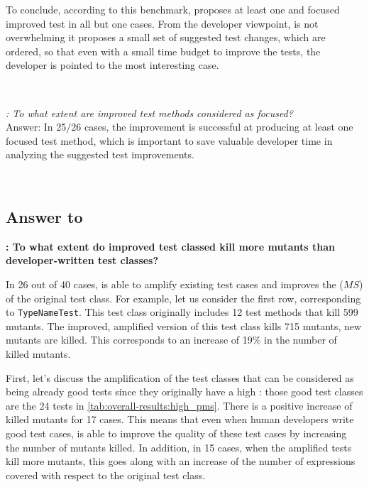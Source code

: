 To conclude, according to this benchmark, \dspot{} proposes at least one and focused improved test in all but one cases. From the developer viewpoint, \dspot is not overwhelming it proposes a small set of suggested test changes, which are ordered, so that even with a small time budget to improve the tests, the developer is pointed to the most interesting case.

~\\
\begin{mdframed}
	\textit{\rqcandidates{}:  To what extent are improved test methods considered as focused?}\\
	Answer: In 25/26 cases, the improvement is successful at producing at least one focused test method, which is important to save valuable developer time in analyzing the suggested test improvements.
\end{mdframed}
~\\



\subsection{Answer to \rqeffectiveness}
\label{subsec:test-improvement:experiment-results:rq3}

\textbf{\rqeffectiveness: To what extent do improved test classed kill more mutants than developer-written test classes?}

In 26 out of 40 cases, \dspot{} is able to amplify existing test cases and improves the \ms ($MS$) of the original test class.
For example, let us consider the first row, corresponding to \texttt{TypeNameTest}. 
This test class originally includes 12 test methods that kill 599 mutants. 
The improved, amplified version of this test class kills 715 mutants,  new mutants are killed.
 This corresponds to an increase of 19\% in the number of killed mutants.

First, let's discuss the amplification of the test classes that can be considered as being already good tests since they originally have a high \ms: those good test classes are the 24 tests in \autoref{tab:overall-results:high_pms}.
There is a positive increase of killed mutants for 17 cases.
This means that even when human developers write good test cases, \dspot{} is able to improve the quality of these test cases by increasing the number of mutants killed. 
In addition, in 15 cases, when the amplified tests kill more mutants, this goes along with an increase of the number of expressions covered with respect to the original test class.

